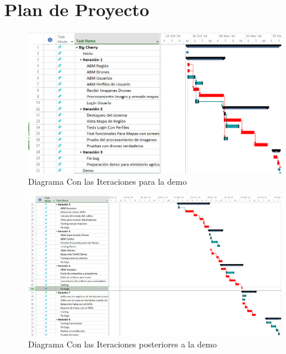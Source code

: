 
\section{Plan de Proyecto}

\begin{figure}[h!]
  \centering
  \includegraphics[width=1\textwidth]{demo.png}
  \caption{Diagrama Con las Iteraciones para la demo}
  \label{fig:clases4}
\end{figure}

\begin{figure}[h!]
  \centering
  \includegraphics[width=1\textwidth]{ult.png}
  \caption{Diagrama Con las Iteraciones posteriores a la demo}
  \label{fig:clases4}
\end{figure}

\clearpage


